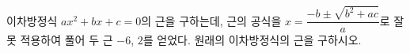 이차방정식 $ax^2+bx+c=0$의 근을 구하는데, 근의 공식을 $x=\dfrac{-b\pm\sqrt{b^2+ac}}{a}$로 잘못 적용하여 풀어 두 근 $-6$, $2$를 얻었다. 원래의 이차방정식의 근을 구하시오. 
